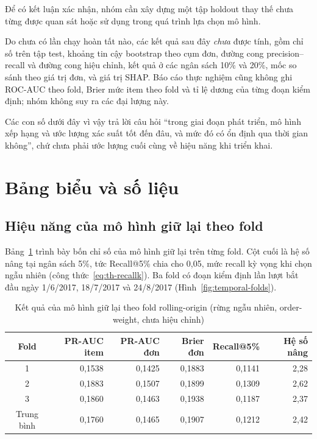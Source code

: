 \documentclass[12pt,a4paper]{report}
\begin{document}
Để có kết luận xác nhận, nhóm cần xây dựng một tập holdout thay thế chưa từng được quan sát hoặc sử dụng trong quá trình lựa chọn mô hình. 

Do chưa có lần chạy hoàn tất nào, các kết quả sau đây \emph{chưa} được tính, gồm chỉ số trên tập test, khoảng tin cậy bootstrap theo cụm đơn, đường cong precision--recall và đường cong hiệu chỉnh, kết quả ở các ngân sách 10\% và 20\%, mốc so sánh theo giá trị đơn, và giá trị SHAP. Báo cáo thực nghiệm cũng không ghi ROC-AUC theo fold, Brier mức item theo fold và tỉ lệ dương của từng đoạn kiểm định; nhóm không suy ra các đại lượng này.

Các con số dưới đây vì vậy trả lời câu hỏi ``trong giai đoạn phát triển, mô hình xếp hạng và ước lượng xác suất tốt đến đâu, và mức đó có ổn định qua thời gian không'', chứ chưa phải ước lượng cuối cùng về hiệu năng khi triển khai.

\section{Bảng biểu và số liệu}\label{sec:tables}

\subsection{Hiệu năng của mô hình giữ lại theo fold}\label{subsec:tab-folds}

Bảng~\ref{tab:res-folds} trình bày bốn chỉ số của mô hình giữ lại trên từng fold. Cột cuối là hệ số nâng tại ngân sách 5\%, tức Recall@5\% chia cho 0,05, mức recall kỳ vọng khi chọn ngẫu nhiên (công thức~\eqref{eq:th-recallk}). Ba fold có đoạn kiểm định lần lượt bắt đầu ngày 1/6/2017, 18/7/2017 và 24/8/2017 (Hình~\ref{fig:temporal-folds}).

\begin{table}[htbp]\centering\small
\caption{Kết quả của mô hình giữ lại theo fold rolling-origin (rừng ngẫu nhiên, order-weight, chưa hiệu chỉnh)}\label{tab:res-folds}
\begin{tabular}{crrrrr}
\toprule
Fold & PR-AUC item & PR-AUC đơn & Brier đơn & Recall@5\% & Hệ số nâng \\
\midrule
1 & 0,1538 & 0,1425 & 0,1883 & 0,1141 & 2,28 \\
2 & 0,1883 & 0,1507 & 0,1899 & 0,1309 & 2,62 \\
3 & 0,1860 & 0,1463 & 0,1938 & 0,1187 & 2,37 \\
\midrule
Trung bình & 0,1760 & 0,1465 & 0,1907 & 0,1212 & 2,42 \\
\bottomrule
\end{tabular}
\end{table}
\end{document}
